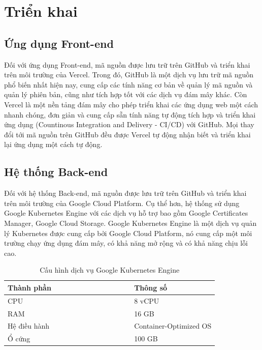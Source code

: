 \documentclass[../DoAn.tex]{subfiles}
\begin{document}
\newpage

\section{Triển khai}
\label{section:4.5}
\subsection{Ứng dụng Front-end}
\label{subsection:4.5.1}
Đối với ứng dụng Front-end, mã nguồn được lưu trữ trên GitHub và triển khai trên môi trường của Vercel. Trong đó, GitHub là một dịch vụ lưu trữ mã nguồn phổ biến nhất
hiện nay, cung cấp các tính năng cơ bản về quản lý mã nguồn và quản lý phiên bản, cũng như tích hợp tốt với các dịch vụ đám mây khác. Còn Vercel là một nền tảng đám mây
cho phép triển khai các ứng dụng web một cách nhanh chóng, đơn giản và cung cấp sẵn tính năng tự động tích hợp và triển khai ứng dụng (Countinous Integration and Delivery - CI/CD) với GitHub.
Mọi thay đổi tới mã nguồn trên GitHub đều được Vercel tự động nhận biết và triển khai lại ứng dụng một cách tự động.

\subsection{Hệ thống Back-end}
\label{subsection:4.5.2}
Đối với hệ thống Back-end, mã nguồn được lưu trữ trên GitHub và triển khai trên môi trường của Google Cloud Platform. Cụ thể hơn, hệ thống sử dụng
Google Kubernetes Engine với các dịch vụ hỗ trợ bao gồm Google Certificates Manager, Google Cloud Storage. Google Kubernetes Engine là một dịch vụ quản lý
Kubernetes được cung cấp bởi Google Cloud Platform, nó cung cấp một môi trường chạy ứng dụng đám mây, có khả năng mở rộng và có khả năng chịu lỗi cao.

\begin{table}[H]
    \renewcommand{\arraystretch}{1.2}
    \centering{}
    \begin{tabular}{p{0.6\linewidth}p{0.4\linewidth}}
        \hline
        \textbf{Thành phần} & \textbf{Thông số}      \\ \hline
        CPU                 & 8 vCPU                 \\ \hline
        RAM                 & 16 GB                  \\ \hline
        Hệ điều hành        & Container-Optimized OS \\ \hline
        Ổ cứng              & 100 GB                 \\ \hline
    \end{tabular}
    \renewcommand{\arraystretch}{1}
    \caption{Cấu hình dịch vụ Google Kubernetes Engine}
    \label{fig:my_label}
\end{table}
\end{document}
